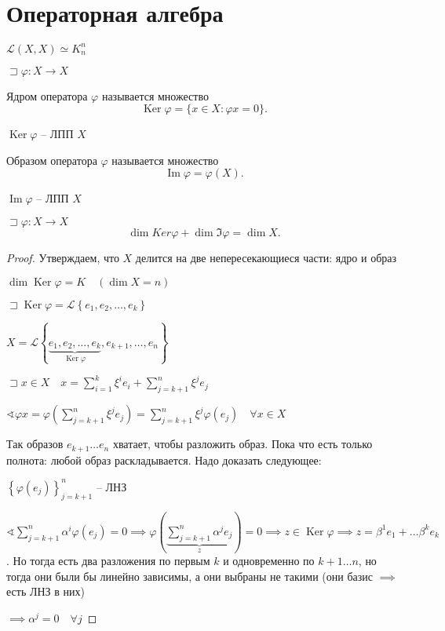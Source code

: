 \documentclass{book}
\DeclareMathOperator{\Image}{Im}
\DeclareMathOperator{\Ker}{Ker}
\theoremstyle{definition}
\begin{document}
\section{Операторная алгебра}

$\mathcal{L}(X, X) \simeq K^n_n$

 $\sqsupset \varphi : X\to X$

\begin{definition}
    Ядром оператора $\varphi$ называется множество
     \[
         \Ker \varphi = \{x\in X: \varphi x = 0\}
    .\] 
\end{definition}

\begin{lemma}
    $\Ker \varphi$ -- ЛПП  $X$
\end{lemma}

\begin{definition}
    Образом оператора $\varphi$ называется множество
     \[
         \Image \varphi = \varphi(X)
    .\] 
\end{definition}
\begin{lemma}
    $\Image \varphi $ -- ЛПП $X$
\end{lemma}

\begin{theorem}
    $\sqsupset \varphi: X\to X$
    \[
    \dim Ker\varphi + \dim \Im \varphi = \dim X
    .\] 
\end{theorem}
\begin{proof}
    Утверждаем, что $X$ делится на две непересекающиеся части: ядро и образ

    $\dim \Ker \varphi = K\quad \left( \dim X = n \right) $  

    $\sqsupset \Ker\varphi = \mathcal{L}\left\{ e_1, e_2, \ldots, e_k \right\} $ 

    $X = \mathcal{L}\left\{ \underbrace{e_1, e_2, \ldots, e_k}_{\Ker \varphi}, e_{k+1}, \ldots, e_n \right\} $

    $\sqsupset x\in X\quad x = \sum_{i=1}^{k} \xi^ie_i + \sum_{j=k+1}^{n} \xi^je_j$ 

    $\sphericalangle  \varphi x = \varphi\left( \sum_{j=k+1}^{n} \xi^je_j \right)  = \sum_{j=k+1}^{n} \xi^j\varphi\left( e_j \right)\quad \forall x\in X$ 

    Так образов $e_{k+1} \ldots e_n$ хватает, чтобы разложить образ. Пока что есть только полнота: любой образ раскладывается. Надо доказать следующее: 

    $\left\{ \varphi\left( e_j \right)  \right\} _{j = k+1}^n$  -- ЛНЗ

    $\sphericalangle \sum_{j=k+1}^{n} \alpha^i\varphi(e_j) = 0 \implies  \varphi\left( \underbrace{\sum_{j=k+1}^{n} \alpha^je_j}_{z} \right) = 0 \implies z\in \Ker\varphi \implies z = \beta^1e_1 + \ldots \beta^ke_k $. Но тогда есть два разложения по первым $k$ и одновременно по $k+1 \ldots n$, но тогда они были бы линейно зависимы, а они выбраны не такими (они базис $ \implies $ есть ЛНЗ в них)

    $\implies \alpha^j = 0\quad \forall j$


\end{proof}
\end{document}
